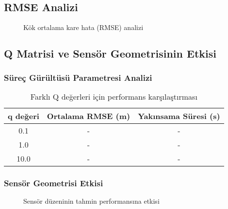 \documentclass[12pt,a4paper]{article}
\begin{document}
\subsection{RMSE Analizi}
\begin{figure}[H]
    \centering
    \caption{Kök ortalama kare hata (RMSE) analizi}
    \label{fig:rmse}
\end{figure}

\subsection{Q Matrisi ve Sensör Geometrisinin Etkisi}

\subsubsection{Süreç Gürültüsü Parametresi Analizi}
\begin{table}[H]
\centering
\caption{Farklı Q değerleri için performans karşılaştırması}
\begin{tabular}{|c|c|c|}
\hline
\textbf{q değeri} & \textbf{Ortalama RMSE (m)} & \textbf{Yakınsama Süresi (s)} \\
\hline
0.1 & - & - \\
1.0 & - & - \\
10.0 & - & - \\
\hline
\end{tabular}
\label{tab:q_analysis}
\end{table}

\subsubsection{Sensör Geometrisi Etkisi}
\begin{figure}[H]
    \centering
    \caption{Sensör düzeninin tahmin performansına etkisi}
    \label{fig:sensor_geometry}
\end{figure}
\end{document}
